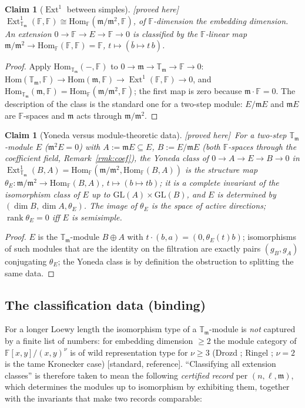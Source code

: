 \documentclass[11pt]{article}
\newtheorem{claim}[theorem]{Claim}
\theoremstyle{remark}
\newcommand{\F}{\mathbb{F}}
\newcommand{\GL}{\mathrm{GL}}
\newcommand{\Hom}{\mathrm{Hom}}
\DeclareMathOperator{\rank}{rank}
\DeclareMathOperator{\Ext}{Ext}
\newcommand{\T}{\mathbb{T}}
\newcommand{\m}{\mathfrak{m}}
\newcommand{\PROVED}{\textsf{[proved here]}}
\newcommand{\STD}{\textsf{[standard, reference]}}
\begin{document}
\begin{claim}[$\Ext^1$ between simples]\label{cl:ext1}\PROVED\
$\Ext^1_{\T_\m}(\F,\F)\cong\Hom_{\F}(\m/\m^2,\F)$, of $\F$-dimension the embedding dimension.
An extension $0\to\F\to E\to\F\to0$ is classified by the $\F$-linear map
$\m/\m^2\to\Hom_\F(\F,\F)=\F$, $t\mapsto(\bar b\mapsto t\,b)$.
\end{claim}
\begin{proof}
Apply $\Hom_{\T_\m}(-,\F)$ to $0\to\m\to\T_\m\to\F\to0$: $\Hom(\T_\m,\F)\to\Hom(\m,\F)\to
\Ext^1(\F,\F)\to0$, and $\Hom_{\T_\m}(\m,\F)=\Hom_\F(\m/\m^2,\F)$; the first map is zero
because $\m\cdot\F=0$. The description of the class is the standard one for a two-step
module: $E/\m E$ and $\m E$ are $\F$-spaces and $\m$ acts through $\m/\m^2$.
\end{proof}

\begin{claim}[Yoneda versus module-theoretic data]\label{cl:yoneda}\PROVED\
For a two-step $\T_\m$-module $E$ ($\m^2E=0$) with $A:=\m E\subseteq E$, $B:=E/\m E$ (both
$\F$-spaces through the coefficient field, Remark~\ref{rmk:coef}), the Yoneda class of $0\to A\to E\to B\to0$ in $\Ext^1_{\T_\m}(B,A)=\Hom_\F(\m/\m^2,\Hom_\F(B,A))$ is
the \emph{structure map} $\theta_E:\m/\m^2\to\Hom_\F(B,A)$, $t\mapsto(b\mapsto tb)$; it is a
complete invariant of the isomorphism class of $E$ up to $\GL(A)\times\GL(B)$, and $E$ is
determined by $(\dim B,\dim A,\theta_E)$. The image of $\theta_E$ is the space of \emph{active
directions}; $\rank\theta_E=0$ iff $E$ is semisimple.
\end{claim}
\begin{proof}
$E$ is the $\T_\m$-module $B\oplus A$ with $t\cdot(b,a)=(0,\theta_E(t)b)$; isomorphisms of such
modules that are the identity on the filtration are exactly pairs $(g_B,g_A)$ conjugating
$\theta_E$; the Yoneda class is by definition the obstruction to splitting the same data.
\end{proof}

\subsection{The classification data (binding)}\label{sec:classdata}
For a longer Loewy length the isomorphism type of a $\T_\m$-module is \emph{not} captured by a
finite list of numbers: for embedding dimension $\ge2$ the module category of
$\F[x,y]/(x,y)^\nu$ is of wild representation type for $\nu\ge3$ (Drozd \cite{drozd}; Ringel
\cite{ringel}; $\nu=2$ is the tame Kronecker case) \STD. ``Classifying all extension classes'' is therefore taken to mean the following
\emph{certified record} per $(n,\ell,\m)$, which determines the modules up to isomorphism by
exhibiting them, together with the invariants that make two records comparable:
\end{document}
